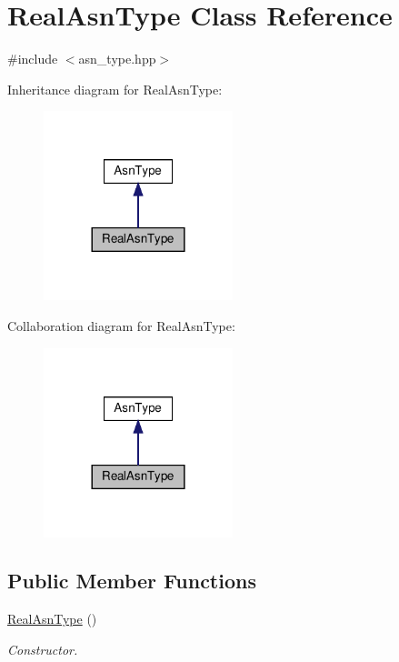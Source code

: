 \hypertarget{classRealAsnType}{}\section{Real\+Asn\+Type Class Reference}
\label{classRealAsnType}


{\ttfamily \#include $<$asn\+\_\+type.\+hpp$>$}



Inheritance diagram for Real\+Asn\+Type\+:
\nopagebreak
\begin{figure}[H]
\begin{center}
\leavevmode
\includegraphics[width=156pt]{db/dbc/classRealAsnType__inherit__graph}
\end{center}
\end{figure}


Collaboration diagram for Real\+Asn\+Type\+:
\nopagebreak
\begin{figure}[H]
\begin{center}
\leavevmode
\includegraphics[width=156pt]{d4/dd5/classRealAsnType__coll__graph}
\end{center}
\end{figure}
\subsection*{Public Member Functions}
\begin{DoxyCompactItemize}
\item 
\hyperlink{classRealAsnType_a090065c4c1be898fdd52bb43a00d745b}{Real\+Asn\+Type} ()
\begin{DoxyCompactList}\small\item\em Constructor. \end{DoxyCompactList}\end{DoxyCompactItemize}
